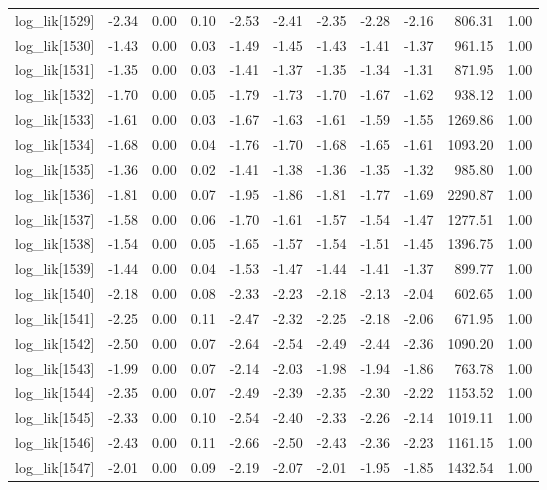 \begin{table}[ht]
\begin{tabular}{rrrrrrrrrrr}
  log\_lik[1529] & -2.34 & 0.00 & 0.10 & -2.53 & -2.41 & -2.35 & -2.28 & -2.16 & 806.31 & 1.00 \\ 
  log\_lik[1530] & -1.43 & 0.00 & 0.03 & -1.49 & -1.45 & -1.43 & -1.41 & -1.37 & 961.15 & 1.00 \\ 
  log\_lik[1531] & -1.35 & 0.00 & 0.03 & -1.41 & -1.37 & -1.35 & -1.34 & -1.31 & 871.95 & 1.00 \\ 
  log\_lik[1532] & -1.70 & 0.00 & 0.05 & -1.79 & -1.73 & -1.70 & -1.67 & -1.62 & 938.12 & 1.00 \\ 
  log\_lik[1533] & -1.61 & 0.00 & 0.03 & -1.67 & -1.63 & -1.61 & -1.59 & -1.55 & 1269.86 & 1.00 \\ 
  log\_lik[1534] & -1.68 & 0.00 & 0.04 & -1.76 & -1.70 & -1.68 & -1.65 & -1.61 & 1093.20 & 1.00 \\ 
  log\_lik[1535] & -1.36 & 0.00 & 0.02 & -1.41 & -1.38 & -1.36 & -1.35 & -1.32 & 985.80 & 1.00 \\ 
  log\_lik[1536] & -1.81 & 0.00 & 0.07 & -1.95 & -1.86 & -1.81 & -1.77 & -1.69 & 2290.87 & 1.00 \\ 
  log\_lik[1537] & -1.58 & 0.00 & 0.06 & -1.70 & -1.61 & -1.57 & -1.54 & -1.47 & 1277.51 & 1.00 \\ 
  log\_lik[1538] & -1.54 & 0.00 & 0.05 & -1.65 & -1.57 & -1.54 & -1.51 & -1.45 & 1396.75 & 1.00 \\ 
  log\_lik[1539] & -1.44 & 0.00 & 0.04 & -1.53 & -1.47 & -1.44 & -1.41 & -1.37 & 899.77 & 1.00 \\ 
  log\_lik[1540] & -2.18 & 0.00 & 0.08 & -2.33 & -2.23 & -2.18 & -2.13 & -2.04 & 602.65 & 1.00 \\ 
  log\_lik[1541] & -2.25 & 0.00 & 0.11 & -2.47 & -2.32 & -2.25 & -2.18 & -2.06 & 671.95 & 1.00 \\ 
  log\_lik[1542] & -2.50 & 0.00 & 0.07 & -2.64 & -2.54 & -2.49 & -2.44 & -2.36 & 1090.20 & 1.00 \\ 
  log\_lik[1543] & -1.99 & 0.00 & 0.07 & -2.14 & -2.03 & -1.98 & -1.94 & -1.86 & 763.78 & 1.00 \\ 
  log\_lik[1544] & -2.35 & 0.00 & 0.07 & -2.49 & -2.39 & -2.35 & -2.30 & -2.22 & 1153.52 & 1.00 \\ 
  log\_lik[1545] & -2.33 & 0.00 & 0.10 & -2.54 & -2.40 & -2.33 & -2.26 & -2.14 & 1019.11 & 1.00 \\ 
  log\_lik[1546] & -2.43 & 0.00 & 0.11 & -2.66 & -2.50 & -2.43 & -2.36 & -2.23 & 1161.15 & 1.00 \\ 
  log\_lik[1547] & -2.01 & 0.00 & 0.09 & -2.19 & -2.07 & -2.01 & -1.95 & -1.85 & 1432.54 & 1.00 \\ 

\end{tabular}
\end{table}
